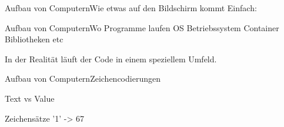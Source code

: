 \begin{frame}{Aufbau von Computern}{Wie etwas auf den Bildschirm kommt}
	Einfach:
	
	
\end{frame}



\begin{frame}{Aufbau von Computern}{Wo Programme laufen}
	OS Betriebssystem
	Container
	Bibliotheken etc
	
	In der Realität läuft der Code in einem speziellem Umfeld.
	
\end{frame}


\begin{frame}{Aufbau von Computern}{Zeichencodierungen}
	
	Text vs Value
	
	Zeichensätze
	'1' -> 67
		
\end{frame}




